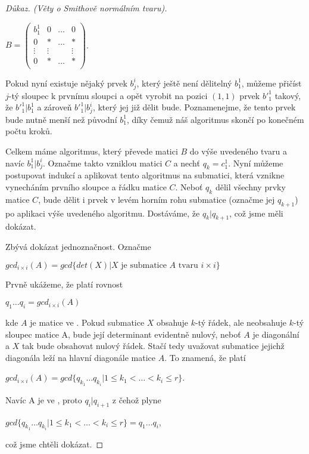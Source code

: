 \begin{proof}[Důkaz. (Věty o Smithově normálním tvaru)]
\begin{center}
$ B =
    \begin{pmatrix}
        b_1^1   & 0      & \hdots & 0       \\
        0       & \ast   & \hdots & \ast    \\
        \vdots  & \vdots &        & \vdots   \\
        0       & \ast   & \hdots & \ast    \\
    \end{pmatrix}
$.
\end{center}


Pokud nyní existuje nějaký prvek $ b_j^i $, který ještě není dělitelný $ b_1^1 $, můžeme
přičíst $j$-tý sloupec k prvnímu sloupci a opět vyrobit na pozici $ (1, 1) $ prvek $ {b'}_{1}^{1} $
takový, že $ {b'}_{1}^{1} \vert b_1^1 $ a zároveň $ {b'}_{1}^{1} \vert b_j^i $,
který jej již dělit bude. Poznamenejme, že tento prvek bude nutně menší než původní
$ b_1^1 $, díky čemuž náš algoritmus skončí po konečném počtu kroků.

Celkem máme algoritmus, který převede matici $B$ do výše uvedeného tvaru
a navíc $ {b}_{1}^{1} \vert b_j^i $.
Označme takto vzniklou matici $ C $ a nechť $ q_k = c_1^1 $.
Nyní můžeme postupovat indukcí a aplikovat tento algoritmus
na submatici, která vznikne vynecháním prvního sloupce a řádku matice $C$.
Neboť $ q_k $ dělil všechny prvky matice $C$, bude dělit i prvek v levém
horním rohu submatice (označme jej $ q_{k+1} $) po aplikaci výše uvedeného algoritmu.
Dostáváme, že $ q_k \vert q_{k+1}$, což jsme měli dokázat.

Zbývá dokázat jednoznačnost. Označme
\begin{center}
$ gcd_{i \times i }(A) = gcd\{det(X) \vert X \textrm{ je submatice } A \textrm{ tvaru }i \times i\} $
\end{center}

Prvně ukážeme, že platí rovnost
\begin{center}
$ q_1 \hdots q_i = gcd_{i \times i }(A)$
\end{center}

kde $ A $ je matice ve \snf. Pokud submatice $ X $ obsahuje $k$-tý řádek, ale
neobsahuje $k$-tý sloupec matice A, bude její determinant evidentně nulový,
neboť $ A $ je diagonální a $ X $ tak bude obsahovat nulový řádek. Stačí tedy
uvažovat submatice jejichž diagonála leží na hlavní diagonále matice $ A $. To
znamená, že platí
\begin{center}
$ gcd_{i \times i }(A) = gcd\{q_{k_1} \hdots q_{k_i} \vert 1 \leq k_1 < \hdots < k_i \leq r \} $.
\end{center}
Navíc A je ve \snf, proto $ q_i | q_{i+1} $ z čehož plyne
\begin{center}
$ gcd\{q_{k_1} \hdots q_{k_i} \vert 1 \leq k_1 < \hdots < k_i \leq r \} = q_1 \hdots q_i $,
\end{center}
což jsme chtěli dokázat.


\end{proof}
